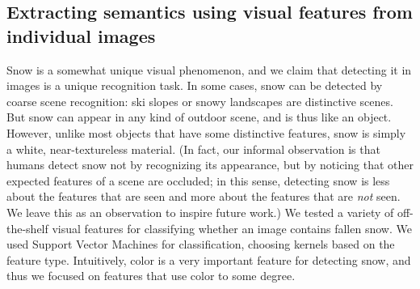 %
%
%






\subsection{Extracting semantics using visual features from individual images}


Snow is a somewhat unique visual phenomenon, and we claim that
detecting it in images is a unique recognition task. In some cases,
snow can be detected by coarse scene recognition: ski slopes or snowy
landscapes are distinctive scenes. But snow can appear in any kind of
outdoor scene, and is thus like an object. However, unlike most
objects that have some distinctive features, snow is simply a white,
near-textureless material.  (In fact, our informal observation is that
humans detect snow not by recognizing its appearance, but by noticing
that other expected features of a scene are occluded; in this sense,
detecting snow is less about the features that are seen and more about
the features that are \textit{not} seen. We leave this as an
observation to inspire future work.)
%
We tested a variety of off-the-shelf visual features for classifying
whether an image contains fallen snow. We used Support Vector
Machines for classification, choosing kernels based on the feature
type.  Intuitively, color is a very important feature for detecting
snow, and thus we focused on features that use color to some
degree.  

